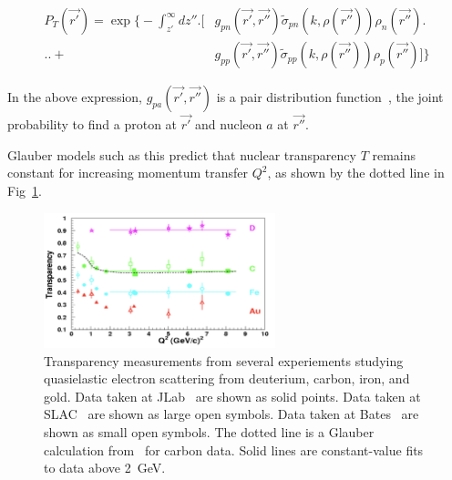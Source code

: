 \begin{equation}
\begin{aligned}
    P_{T}(\vec{r'}) = \exp \biggl\{-\int_{z'}^{\infty} dz'' \biggr.\biggl[&g_{p n}(\vec{r'}, \vec{r''}) \widetilde{\sigma}_{p n}\left(k, \rho(\vec{r''})\right) \rho_{n}(\vec{r''})\biggr.\\
                                                           \biggl.\biggl.+&g_{p p}(\vec{r'}, \vec{r''}) \widetilde{\sigma}_{p p}\left(k, \rho(\vec{r''})\right) \rho_{p}(\vec{r''})\biggr]\biggr\}
\end{aligned}
\end{equation}


In the above expression, $g_{pa}(\vec{r'},\vec{r''})$ is a pair distribution
function~\cite{Schiavilla_1987}, the joint probability to find a proton at
$\vec{r'}$ and nucleon $a$ at $\vec{r''}$.

Glauber models such as this predict that nuclear transparency $T$ remains
constant for increasing momentum transfer $Q^2$, as shown by the dotted line in
Fig~\ref{fig:aeep_transparency_intro}.

\begin{figure}[!h]
    \centering
    \includegraphics[width=0.6\textwidth]{chap2/aeep_transparency.png}
    \caption{Transparency measurements from several experiements studying
             quasielastic electron scattering from deuterium, carbon, iron,
             and gold.
             Data taken at JLab~\cite{Abbot_1998, Garrow_2002, Rohe_2005} are shown as solid points.
             Data taken at SLAC~\cite{Makins_1994, ONeill_1995} are shown as large open symbols.
             Data taken at Bates~\cite{Garino_1992} are shown as small open symbols.
             The dotted line is a Glauber calculation from~\cite{Pandharipande_1992} for carbon data.
             Solid lines are constant-value fits to data above \SI{2}{\giga\electronvolt}.
            }
    \label{fig:aeep_transparency_intro}
\end{figure}



